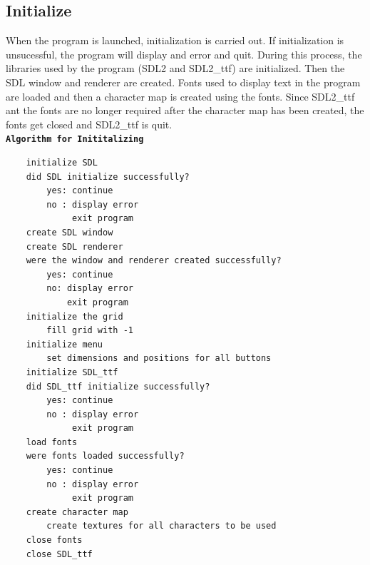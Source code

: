 \documentclass[report]{subfiles}
\begin{document}
    \subsection{Initialize}
    When the program is launched, initialization is carried out. If initialization is unsucessful, the program will display and error and quit. During this process, the libraries used by the program (SDL2 and SDL2\_ttf) are initialized. Then the SDL window and renderer are created. Fonts used to display text in the program are loaded and then a character map is created using the fonts. Since SDL2\_ttf ant the fonts are no longer required after the character map has been created, the fonts get closed and SDL2\_ttf is quit.\\
        \textbf{\texttt{Algorithm for Inititalizing}}
        \begin{verbatim}
    initialize SDL
    did SDL initialize successfully?
        yes: continue
        no : display error
             exit program
    create SDL window
    create SDL renderer
    were the window and renderer created successfully?
        yes: continue
        no: display error
            exit program
    initialize the grid
        fill grid with -1
    initialize menu
        set dimensions and positions for all buttons
    initialize SDL_ttf
    did SDL_ttf initialize successfully?
        yes: continue
        no : display error
             exit program
    load fonts
    were fonts loaded successfully?
        yes: continue
        no : display error
             exit program
    create character map
        create textures for all characters to be used
    close fonts
    close SDL_ttf
        \end{verbatim}
\end{document}
